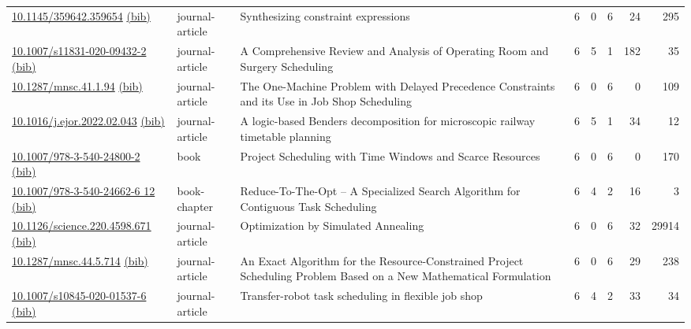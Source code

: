 {\begin{longtable}{p{5cm}lp{11cm}rrrrr}
\href{http://dx.doi.org/10.1145/359642.359654}{10.1145/359642.359654} \href{https://www.doi2bib.org/bib/10.1145/359642.359654}{(bib)} & journal-article & Synthesizing constraint expressions & 6 & 0 & 6 & 24 & 295 \\
\href{http://dx.doi.org/10.1007/s11831-020-09432-2}{10.1007/s11831-020-09432-2} \href{https://www.doi2bib.org/bib/10.1007/s11831-020-09432-2}{(bib)} & journal-article & A Comprehensive Review and Analysis of Operating Room and Surgery Scheduling & 6 & 5 & 1 & 182 & 35 \\
\href{http://dx.doi.org/10.1287/mnsc.41.1.94}{10.1287/mnsc.41.1.94} \href{https://www.doi2bib.org/bib/10.1287/mnsc.41.1.94}{(bib)} & journal-article & The One-Machine Problem with Delayed Precedence Constraints and its Use in Job Shop Scheduling & 6 & 0 & 6 & 0 & 109 \\
\href{http://dx.doi.org/10.1016/j.ejor.2022.02.043}{10.1016/j.ejor.2022.02.043} \href{https://www.doi2bib.org/bib/10.1016/j.ejor.2022.02.043}{(bib)} & journal-article & A logic-based Benders decomposition for microscopic railway timetable planning & 6 & 5 & 1 & 34 & 12 \\
\href{http://dx.doi.org/10.1007/978-3-540-24800-2}{10.1007/978-3-540-24800-2} \href{https://www.doi2bib.org/bib/10.1007/978-3-540-24800-2}{(bib)} & book & Project Scheduling with Time Windows and Scarce Resources & 6 & 0 & 6 & 0 & 170 \\
\href{http://dx.doi.org/10.1007/978-3-540-24662-6_12}{10.1007/978-3-540-24662-6 12} \href{https://www.doi2bib.org/bib/10.1007/978-3-540-24662-6_12}{(bib)} & book-chapter & Reduce-To-The-Opt – A Specialized Search Algorithm for Contiguous Task Scheduling & 6 & 4 & 2 & 16 & 3 \\
\href{http://dx.doi.org/10.1126/science.220.4598.671}{10.1126/science.220.4598.671} \href{https://www.doi2bib.org/bib/10.1126/science.220.4598.671}{(bib)} & journal-article & Optimization by Simulated Annealing & 6 & 0 & 6 & 32 & 29914 \\
\href{http://dx.doi.org/10.1287/mnsc.44.5.714}{10.1287/mnsc.44.5.714} \href{https://www.doi2bib.org/bib/10.1287/mnsc.44.5.714}{(bib)} & journal-article & An Exact Algorithm for the Resource-Constrained Project Scheduling Problem Based on a New Mathematical Formulation & 6 & 0 & 6 & 29 & 238 \\
\href{http://dx.doi.org/10.1007/s10845-020-01537-6}{10.1007/s10845-020-01537-6} \href{https://www.doi2bib.org/bib/10.1007/s10845-020-01537-6}{(bib)} & journal-article & Transfer-robot task scheduling in flexible job shop & 6 & 4 & 2 & 33 & 34 \\

\end{longtable}}

